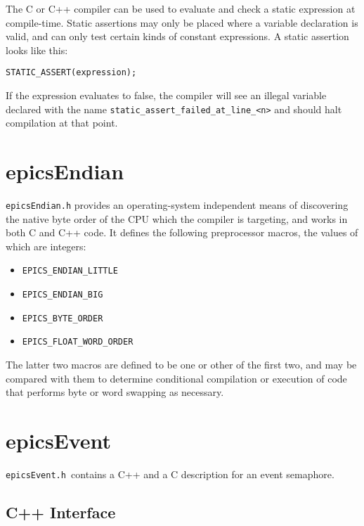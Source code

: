 The C or C++ compiler can be used to evaluate and check a static expression at compile-time.
Static assertions may only be placed where a variable declaration is valid, and can only test certain kinds of constant expressions.
A static assertion looks like this:

\begin{verbatim}
STATIC_ASSERT(expression);
\end{verbatim}

If the expression evaluates to false, the compiler will see an illegal variable declared with the name \verb|static_assert_failed_at_line_<n>| and should halt compilation at that point.

\section{epicsEndian}

\verb|epicsEndian.h| provides an operating-system independent means of discovering the native byte order of the CPU which the compiler is targeting, and works in both C and C++ code.
It defines the following preprocessor macros, the values of which are integers:

\begin{itemize}
\item \verb|EPICS_ENDIAN_LITTLE|
\item \verb|EPICS_ENDIAN_BIG|
\item \verb|EPICS_BYTE_ORDER|
\item \verb|EPICS_FLOAT_WORD_ORDER|
\end{itemize}

The latter two macros are defined to be one or other of the first two, and may be compared with them to determine conditional compilation or execution of code that performs byte or word swapping as necessary.

\section{epicsEvent}

\verb|epicsEvent.h |contains a C++ and a C description for an event semaphore.

\subsection{C++ Interface}

